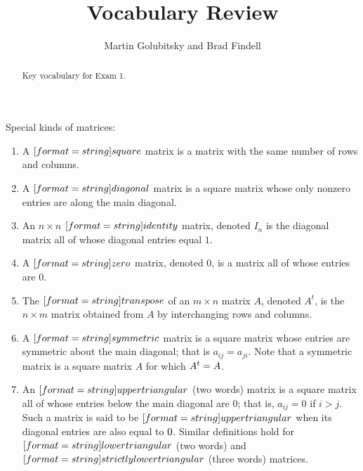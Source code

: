 \documentclass{ximera}
\title{Vocabulary Review}
\author{Martin Golubitsky and Brad Findell}
\begin{document}
\begin{abstract}
Key vocabulary for Exam 1.
\end{abstract}
\maketitle


\begin{question}
Special kinds of matrices:  
\begin{enumerate}

\item A $[format=string]{square}$ matrix is a matrix
with the same number of rows and columns.  

\item A $[format=string]{diagonal}$ matrix is a
square matrix whose only nonzero entries are along the main diagonal. 

\item An $n\times n$ $[format=string]{identity}$ matrix, denoted $I_n$ is the 
diagonal matrix all of whose diagonal entries equal $1$.  

\item A $[format=string]{zero}$ matrix, denoted $0$, is a matrix all
of whose entries are $0$.   

\item The $[format=string]{transpose}$ of an $m\times n$
matrix $A$, denoted $A^t$, is the $n\times m$ matrix obtained from $A$ by
interchanging rows and columns.

\item A $[format=string]{symmetric}$ matrix is a square matrix whose entries are symmetric about the main
diagonal; that is $a_{ij}=a_{ji}$.  Note that a symmetric matrix
is a square matrix $A$ for which $A^t={A}$.

\item An $[format=string]{upper triangular}$ (two words) matrix is a square matrix all of whose entries below the
main diagonal are $0$; that is, $a_{ij}=0$ if $i>j$.  
Such a matrix is said to be 
$[format=string]{upper triangular}$ when its diagonal entries are also equal to ${0}$.  Similar
definitions hold for $[format=string]{lower triangular}$ (two words)
and $[format=string]{strictly lower triangular}$ (three words) matrices.  

\end{enumerate}
\end{question}
\end{document}
